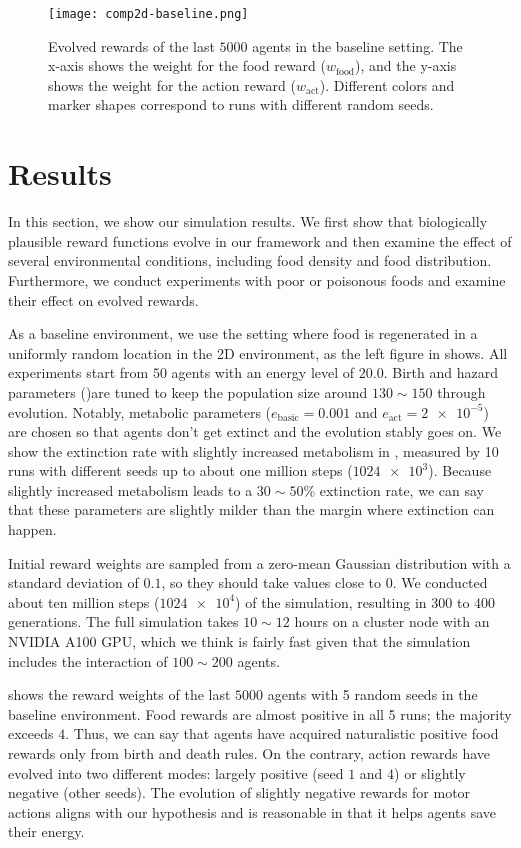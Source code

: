 \begin{figure}[t]
  \centering
  \texttt{[image: comp2d-baseline.png]}
  \caption{
    Evolved rewards of the last $5000$ agents in the baseline setting.
    The x-axis shows the weight for the food reward ($w_{\mathrm{food}}$), and the y-axis shows the weight for the action reward ($w_{\mathrm{act}}$).
    Different colors and marker shapes correspond to runs with different random seeds.
  }\label{figure:result-baseline}
\end{figure}

\section{Results}
In this section, we show our simulation results. We first show that biologically plausible reward functions evolve in our framework and then examine the effect of several environmental conditions, including food density and food distribution. Furthermore, we conduct experiments with poor or poisonous foods and examine their effect on evolved rewards.

As a baseline environment, we use the setting where food is regenerated in a uniformly random location in the 2D environment, as the left figure in  shows. All experiments start from $50$ agents with an energy level of $20.0$. Birth and hazard parameters ()are tuned to keep the population size around $130\sim 150$ through evolution. Notably, metabolic parameters ($e_{\mathrm{basic}} = 0.001$ and $e_{\mathrm{act}} = \num{2e-5}$) are chosen so that agents don't get extinct and the evolution stably goes on. We show the extinction rate with slightly increased metabolism in , measured by 10 runs with different seeds up to about one million steps ($\num{1024e3}$). Because slightly increased metabolism leads to a $30\sim50\%$ extinction rate, we can say that these parameters are slightly milder than the margin where extinction can happen.

Initial reward weights are sampled from a zero-mean Gaussian distribution with a standard deviation of $0.1$, so they should take values close to $0$. We conducted about ten million steps ($\num{1024e4}$) of the simulation, resulting in $300$ to $400$ generations. The full simulation takes $10\sim12$ hours on a cluster node with an NVIDIA A100 GPU, which we think is fairly fast given that the simulation includes the interaction of $100\sim200$ agents.

 shows the reward weights of the last $5000$ agents with 5 random seeds in the baseline environment. Food rewards are almost positive in all 5 runs; the majority exceeds $4$. Thus, we can say that agents have acquired naturalistic positive food rewards only from birth and death rules. On the contrary, action rewards have evolved into two different modes: largely positive (seed $1$ and $4$) or slightly negative (other seeds). The evolution of slightly negative rewards for motor actions aligns with our hypothesis and is reasonable in that it helps agents save their energy.

